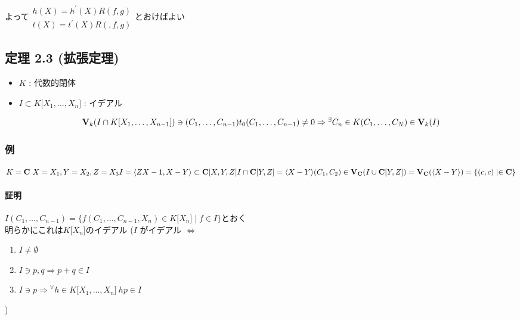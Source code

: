 \documentclass[12pt,a4paper]{article}
\begin{document}
  よって$ \begin{array}{l}h(X) = h^\prime (X) R(f, g) \\ t(X) = t^\prime (X) R(,f, g) \end{array}$とおけばよい

\subsection*{定理 2.3 (拡張定理)}
  \begin{itemize}
    \item $K$ : 代数的閉体
    \item $ I \subset{} K \lbrack{} X_1, \ldots, X_n \rbrack{} $ : イデアル
  \end{itemize}
  \[ \mathbf{V}_k (I \cap K \lbrack X_1, \ldots, X_{n-1} \rbrack ) \ni ( C_1, \ldots , C_{n-1} )  \\
  t_0 (C_1, \ldots , C_{n-1} )\neq 0 \Rightarrow {}^\exists C_n \in K (C_1, \ldots , C_N) \in \mathbf{V}_k (I) \]

  \subsubsection*{例}
    $K = \mathbf{C} \ X = X_1, Y = X_2, Z = X_3 \\
      I = \langle ZX -1, X-Y \rangle \subset \mathbf C \lbrack X, Y, Z \rbrack \\
      I \cap \mathbf C \lbrack Y, Z \rbrack = \langle X - Y \rangle \\
    (C_1, C_2) \in \mathbf{V}_\mathbf{C} (I \cup \mathbf{C} \lbrack Y, Z \rbrack) = \mathbf{V}_\mathbf{C} (\langle X - Y \rangle) = \lbrace (c, c) \mid \in \mathbf{C} \rbrace $

    \paragraph{証明}
      $I ( C_1, \ldots , C_{n-1})  = \lbrace f(C_1, \ldots, C_{n-1}, X_n) \in K \lbrack X_n \rbrack \mid f \in I \rbrace$とおく \\
      明らかにこれは$K \lbrack X_n \rbrack$のイデアル 
      ($I$ がイデアル $\Leftrightarrow $
        \begin{enumerate}
          \item $I \neq \emptyset$
          \item $I \ni p, q \Rightarrow p + q \in I$
          \item $I \ni p \Rightarrow{} {}^\forall h \in K\lbrack X_1, \ldots, X_n \rbrack \  hp \in I$
        \end{enumerate})
\end{document}
